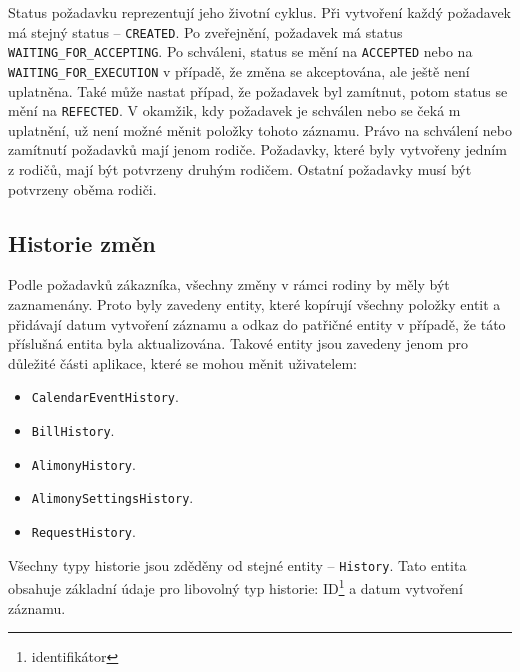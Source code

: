         Status požadavku reprezentují jeho životní cyklus. Při vytvoření každý požadavek má stejný status -- \verb|CREATED|. Po zveřejnění, požadavek má status \verb|WAITING_FOR_ACCEPTING|. Po schváleni, status se mění na \verb|ACCEPTED| nebo na \verb|WAITING_FOR_EXECUTION| v případě, že změna se akceptována, ale ještě není uplatněna. Také může nastat případ, že požadavek byl zamítnut, potom status se mění na \verb|REFECTED|. V okamžik, kdy požadavek je schválen nebo se čeká m uplatnění, už není možné měnit položky tohoto záznamu. Právo na schválení nebo zamítnutí požadavků mají jenom rodiče. Požadavky, které byly vytvořeny jedním z rodičů, mají být potvrzeny druhým rodičem. Ostatní požadavky musí být potvrzeny oběma rodiči.
    
    \subsection{Historie změn}
        Podle požadavků zákazníka, všechny změny v rámci rodiny by měly být zaznamenány. Proto byly zavedeny entity, které kopírují všechny položky entit a přidávají datum vytvoření záznamu a odkaz do patřičné entity v případě, že táto příslušná entita byla aktualizována. Takové entity jsou zavedeny jenom pro důležité části aplikace, které se mohou měnit uživatelem:
        \begin{itemize}
            \item \texttt{CalendarEventHistory}.
            \item \texttt{BillHistory}.
            \item \texttt{AlimonyHistory}.
            \item \texttt{AlimonySettingsHistory}.
            \item \texttt{RequestHistory}.
        \end{itemize}
        Všechny typy historie jsou zděděny od stejné entity -- \texttt{History}. Tato entita obsahuje základní údaje pro libovolný typ historie: ID\footnote{identifikátor} a datum vytvoření záznamu. 
     
